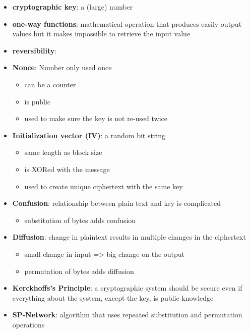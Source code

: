 \documentclass[11pt,twoside,landscape]{article}
\begin{document}
\begin{multicols}{4}
\begin{itemize}
\item \textbf{cryptographic key}: a (large) number

\item \textbf{one-way functions}: mathematical operation that produces easily output values but it makes impossible to retrieve the input value

\item \textbf{reversibility}:

\item \textbf{Nonce}: Number only used once
\begin{itemize}
\item can be a counter
\item is public
\item used to make sure the key is not re-used twice
\end{itemize}

\item \textbf{Initialization vector (IV)}: a random bit string
\begin{itemize}
\item same length as block size
\item is XORed with the message
\item used to create unique ciphertext with the same key
\end{itemize}

\item \textbf{Confusion}: relationship between plain text and key is complicated
\begin{itemize}
\item substitution of bytes adds confusion
\end{itemize}

\item \textbf{Diffusion}: change in plaintext results in multiple changes in the ciphertext
\begin{itemize}
\item small change in input => big change on the output
\item permutation of bytes adds diffusion
\end{itemize}

\item \textbf{Kerckhoffs's Principle}: a cryptographic system should be secure even if everything about the system, except the key, is public knowledge

\item \textbf{SP-Network}: algorithm that uses repeated substitution and permutation operations


\end{itemize}
\end{multicols}
\end{document}
